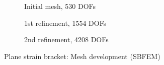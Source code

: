 \begin{figure}[h!]
    \centering
    \begin{subfigure}[b]{0.4\linewidth}
        \centering
        \caption{Initial mesh, 530 DOFs}
    \end{subfigure}
    \begin{subfigure}[b]{0.4\linewidth}
        \centering
        \caption{1st refinement, 1554 DOFs}
    \end{subfigure}
    \begin{subfigure}[b]{0.4\linewidth}
        \centering
        \caption{2nd refinement, 4208 DOFs}
    \end{subfigure}
    \caption{Plane strain bracket: Mesh development (SBFEM)}
    \label{adap_fig:ex_bracket_mesh_sbfem}
\end{figure}


